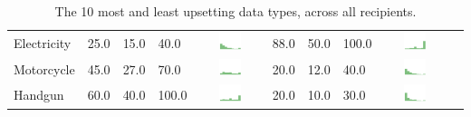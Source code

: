 \begin{table}[t]
\begin{center}
\begin{tabular}{| p{2cm} | p{1cm} | p{1cm} | p{1cm} | c | p{2cm} | p{1cm} | p{1cm} | p{1cm} | c |}
Electricity & 25.0 & 15.0 & 40.0 & \includegraphics[width = 2cm, height = 0.5cm]{tables/ElectricityRisk} & 88.0 & 50.0 & 100.0 & \includegraphics[width = 2cm, height = 0.5cm]{tables/ElectricityBenefit}  \\ 
Motorcycle & 45.0 & 27.0 & 70.0 & \includegraphics[width = 2cm, height = 0.5cm]{tables/MotorcycleRisk} & 20.0 & 12.0 & 40.0 & \includegraphics[width = 2cm, height = 0.5cm]{tables/MotorcycleBenefit} \\ 
Handgun & 60.0 & 40.0 & 100.0 & \includegraphics[width = 2cm, height = 0.5cm]{tables/HandgunRisk}& 20.0 & 10.0 & 30.0 & \includegraphics[width = 2cm, height = 0.5cm]{tables/HandgunBenefit}  \\ 
\hline
\end{tabular}
\caption{The 10 most and least upsetting data types, across all recipients.}
\label{top10}
\end{center}
\end{table}
